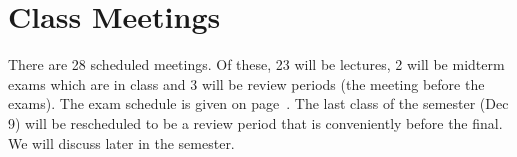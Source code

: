 
\section*{Class Meetings}

There are 28 scheduled meetings. Of these, 23 will be lectures, 2 will be midterm exams which are in class and 3 will be review periods (the meeting before the exams). The exam schedule is given on page~\pageref{subsec:exam_schedule}. The last class of the semester (Dec 9) will be rescheduled to be a review period that is conveniently before the final. We will discuss later in the semester. %